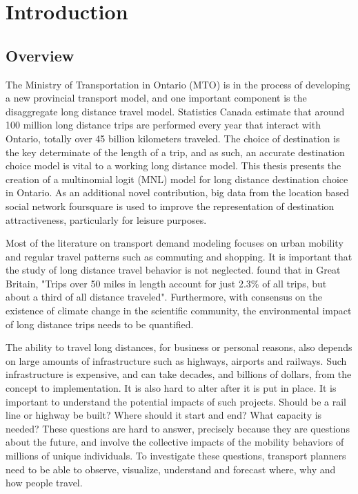 \chapter{Introduction}
\section{Overview}
The Ministry of Transportation in Ontario (MTO) is in the process of developing a new provincial transport model, and one important component is the disaggregate long distance travel model. Statistics Canada estimate that around 100 million long distance trips are performed every year that interact with Ontario, totally over 45 billion kilometers traveled. The choice of destination is the key determinate of the length of a trip, and as such, an accurate destination choice model is vital to a working long distance model. This thesis presents the creation of a multinomial logit (MNL) model for long distance destination choice in Ontario. As an additional novel contribution, big data from the location based social network foursquare is used to improve the representation of destination attractiveness, particularly for leisure purposes.

Most of the literature on transport demand modeling focuses on urban mobility and regular travel patterns such as commuting and shopping. It is important that the study of long distance travel behavior is not neglected. \textcite{rohr2010modelling} found that in Great Britain, "Trips over 50 miles in length account for just 2.3\% of all trips, but about a third of all distance traveled". Furthermore, with  consensus on the existence of climate change in the scientific community, the environmental impact of long distance trips needs to be quantified. 

The ability to travel long distances, for business or personal reasons, also depends on large amounts of infrastructure such as highways, airports and railways. Such infrastructure is expensive, and can take decades, and billions of dollars, from the concept to implementation. It is also hard to alter after it is put in place. It is important to understand the potential impacts of such projects. Should be a rail line or highway be built? Where should it start and end? What capacity is needed? These questions are hard to answer, precisely because they are questions about the future, and involve the collective impacts of the mobility behaviors of millions of unique individuals. To investigate these questions, transport planners need to be able to observe, visualize, understand and forecast where, why and how people travel. 

